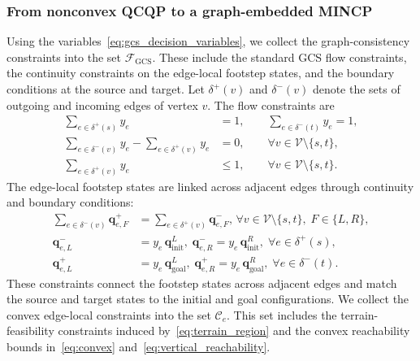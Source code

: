 \documentclass[letterpaper, 10 pt, journal, twoside]{IEEEtran}
\begin{document}
\subsubsection{From nonconvex QCQP to a graph-embedded MINCP}

Using the variables~\eqref{eq:gcs_decision_variables}, we collect the graph-consistency constraints into the set $\mathcal F_{\mathrm{GCS}}$.
These include the standard GCS flow constraints, the continuity constraints on the edge-local footstep states, and the boundary conditions at the source and target.
Let $\delta^+(v)$ and $\delta^-(v)$ denote the sets of outgoing and incoming edges of vertex $v$.
The flow constraints are
\begin{subequations}\label{eq:gcs_flow}
\begin{align}
\sum_{e\in\delta^+(s)} y_e &= 1, \qquad
\sum_{e\in\delta^-(t)} y_e = 1, \label{eq:gcs_flow_st}\\
\sum_{e\in\delta^-(v)} y_e - \sum_{e\in\delta^+(v)} y_e &= 0,
\qquad \forall v\in\mathcal V\setminus\{s,t\}, \label{eq:gcs_flow_cons}\\
\sum_{e\in\delta^+(v)} y_e &\le 1,
\qquad \forall v\in\mathcal V\setminus\{s,t\}. \label{eq:gcs_outflow_cap}
\end{align}
\end{subequations}
\indent
The edge-local footstep states are linked across adjacent edges through continuity and boundary conditions:
\begin{equation}\label{eq:gcs_state_linking}
\begin{alignedat}{3}
\sum_{e\in\delta^-(v)} \mathbf{q}_{e,F}^{+}
&= \sum_{e\in\delta^+(v)} \mathbf{q}_{e,F}^{-},
\, \forall v\in\mathcal V\setminus\{s,t\},
\; F\in\{L,R\},\\
\mathbf{q}_{e,L}^{-} &= y_e\, \mathbf{q}_{\text{init}}^{L},
\;
\mathbf{q}_{e,R}^{-} = y_e\, \mathbf{q}_{\text{init}}^{R},
\; \forall e\in\delta^+(s),\\
\mathbf{q}_{e,L}^{+} &= y_e\, \mathbf{q}_{\text{goal}}^{L},
\;
\mathbf{q}_{e,R}^{+} = y_e\, \mathbf{q}_{\text{goal}}^{R},
\; \forall e\in\delta^-(t).
\end{alignedat}
\end{equation}
\noindent
These constraints connect the footstep states across adjacent edges and match the source and target states to the initial and goal configurations.
We collect the convex edge-local constraints into the set $\mathcal C_e$.
This set includes the terrain-feasibility constraints induced by~\eqref{eq:terrain_region} and the convex reachability bounds in~\eqref{eq:convex} and~\eqref{eq:vertical_reachability}.
\end{document}
